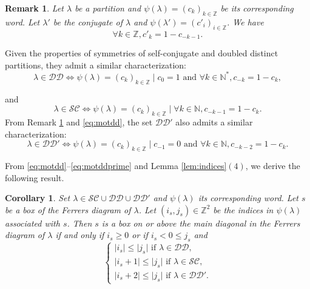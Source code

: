 \documentclass[11pt,letterpaper]{amsart}
\def\bbbz{\mathbb Z}
\def\bbbn{\mathbb N}
\def\ccsc{\mathcal {SC}}
\def\ccdd{\mathcal {DD}}
\newtheorem{cor}[df]{Corollary}
\newtheorem{rk}[df]{Remark}
\numberwithin{equation}{section}
\numberwithin{df}{section}
\begin{document}

\begin{rk}\label{rem:conju}
Let $\lambda$ be a partition and $\psi(\lambda)=(c_k)_{k\in\bbbz}$ be its corresponding word. Let $\lambda'$ be the conjugate of $\lambda$ and $\psi(\lambda')=(c'_i)_{i\in\bbbz}$. We have
$$\forall k\in\bbbz, c'_k=1-c_{-k-1}.$$
\end{rk}

Given the properties of symmetries of self-conjugate and doubled distinct partitions, they admit a similar characterization:
\begin{equation}\label{eq:motdd}
\lambda\in\ccdd \iff \psi(\lambda)=(c_k)_{k\in\bbbz} \mid c_0=1 \text{ and } \forall k \in \bbbn^*, c_{-k}=1-c_k,
\end{equation}

and
\begin{equation}\label{eq:motsc}
\lambda\in\ccsc \iff \psi(\lambda)=(c_k)_{k\in\bbbz} \mid  \forall k \in \bbbn, c_{-k-1}=1-c_k.
\end{equation}
From Remark \ref{rem:conju} and \eqref{eq:motdd}, the set $\ccdd'$ also admits a similar characterization:
\begin{equation}\label{eq:motddprime}
\lambda\in\ccdd' \iff \psi(\lambda)=(c_k)_{k\in\bbbz} \mid c_{-1}=0 \text{ and } \forall k \in \bbbn, c_{-k-2}=1-c_k.
\end{equation}

From \eqref{eq:motdd}--\eqref{eq:motddprime} and Lemma \ref{lem:indices}$(4)$, we derive the following result.
\begin{cor}\label{cor:position}
Set $\lambda\in  \ccsc\cup\ccdd\cup\ccdd'$ and $\psi(\lambda)$ its corresponding word. Let $s$ be a box of the Ferrers diagram of $\lambda$. Let $(i_s,j_s)\in\bbbz^2$ be the indices in $\psi(\lambda)$ associated with $s$. Then $s$ is a box on or above the main diagonal in the Ferrers diagram of $\lambda$ if and only if $i_s\geq 0$ or if $i_s<0\leq j_s$ and
$$\begin{cases}
\lvert i_s\rvert\leq \lvert j_s\rvert \text{ if } \lambda\in \ccdd,\\
\lvert i_s+1\rvert\leq \lvert j_s\rvert \text{ if } \lambda\in \ccsc,\\
\lvert i_s+2\rvert\leq \lvert j_s\rvert \text{ if } \lambda\in \ccdd'.
\end{cases}$$
\end{cor}
\end{document}
